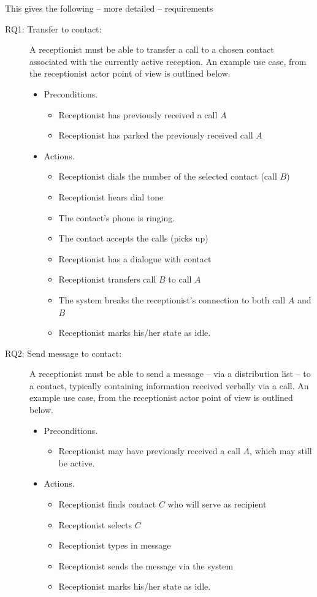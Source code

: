 \documentclass[10pt]{scrreprt}
\begin{document}
This gives the following -- more detailed -- requirements
\begin{description}
  \item[RQ1: Transfer to contact:] A receptionist must be able to transfer a call to a chosen contact associated with the currently active reception. An example use case, from the receptionist actor point of view is outlined below.
  \begin{itemize}
    \item Preconditions.
    \begin{itemize}
      \item Receptionist has previously received a call $A$
      \item Receptionist has parked the previously received call $A$
    \end{itemize}
    \item Actions.
    \begin{itemize}
      \item Receptionist dials the number of the selected contact (call $B$)
      \item Receptionist hears dial tone
      \item The contact's phone is ringing.
      \item The contact accepts the calls (picks up)
      \item Receptionist has a dialogue with contact
      \item Receptionist transfers call $B$ to call $A$
      \item The system breaks the receptionist's connection to both call $A$ and $B$    
      \item Receptionist marks his/her state as idle.
    \end{itemize}
  \end{itemize}

  \item[RQ2: Send message to contact:] A receptionist must be able to send a message -- via a distribution list -- to a contact, typically containing information received verbally via a call. An example use case, from the receptionist actor point of view is outlined below.
  \begin{itemize}
    \item Preconditions.
    \begin{itemize}
      \item Receptionist may have previously received a call $A$, which may still be active.
    \end{itemize}
    \item Actions.
    \begin{itemize}
      \item Receptionist finds contact $C$ who will serve as recipient
      \item Receptionist selects $C$
      \item Receptionist types in message
      \item Receptionist sends the message via the system
      \item Receptionist marks his/her state as idle.
    \end{itemize}
  \end{itemize}
\end{description}
\end{document}
